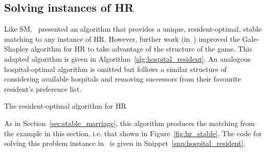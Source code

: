 \subsection{Solving instances of HR}

Like SM,~\cite{Gale1962} presented an algorithm that provides a unique,
resident-optimal, stable matching to any instance of HR. However, further work
(in~\cite{Dubins1981,Roth1984}) improved the Gale-Shapley algorithm for HR to
take advantage of the structure of the game. This adapted algorithm is given in
Algorithm~\ref{alg:hospital_resident}. An analogous hospital-optimal algorithm
is omitted but follows a similar structure of considering available hospitals
and removing successors from their favourite resident's preference list.

\balg%
\caption{The resident-optimal algorithm for HR}\label{alg:hospital_resident}

\vspace{1em}


\ealg%

As in Section~\ref{sec:stable_marriage}, this algorithm produces the matching
from the example in this section, i.e. that shown in Figure~\ref{fig:hr_stable}.
The code for solving this problem instance in \matching\ is given in
Snippet~\ref{snp:hospital_resident}.

